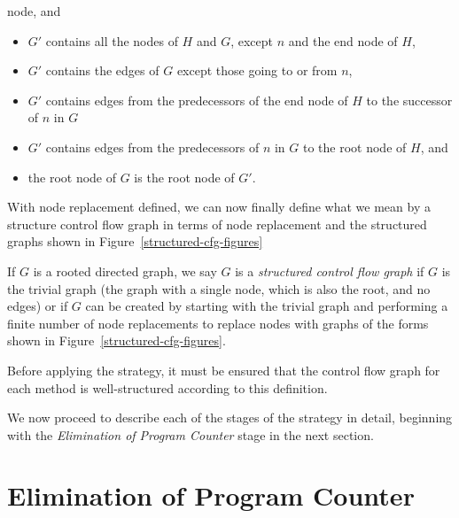 \begin{defn}
\begin{itemize}
    node, and
    \begin{itemize}
    \item $G'$ contains all the nodes of $H$ and $G$, except $n$ and
      the end node of $H$,
    \item $G'$ contains the edges of $G$ except those going to or from
      $n$,
    \item $G'$ contains edges from the predecessors of the end node of
      $H$ to the successor of $n$ in $G$
    \item $G'$ contains edges from the predecessors of $n$ in $G$ to
      the root node of $H$, and
    \item the root node of $G$ is the root node of $G'$.
    \end{itemize}
  \end{itemize}
\end{defn}

With node replacement defined, we can now finally define what we mean
by a structure control flow graph in terms of node replacement and the
structured graphs shown in Figure~\ref{structured-cfg-figures}

\begin{defn}
  If $G$ is a rooted directed graph, we say $G$ is a \emph{structured
    control flow graph} if $G$ is the trivial graph (the graph with a
  single node, which is also the root, and no edges) or if $G$ can be
  created by starting with the trivial graph and performing a finite
  number of node replacements to replace nodes with graphs of the
  forms shown in Figure~\ref{structured-cfg-figures}.
\end{defn}

Before applying the strategy, it must be ensured that the control flow
graph for each method is well-structured according to this definition.

We now proceed to describe each of the stages of the strategy in
detail, beginning with the \emph{Elimination of Program Counter} stage
in the next section.

\section{Elimination of Program Counter}
\label{elimination-of-program-counter-section}

